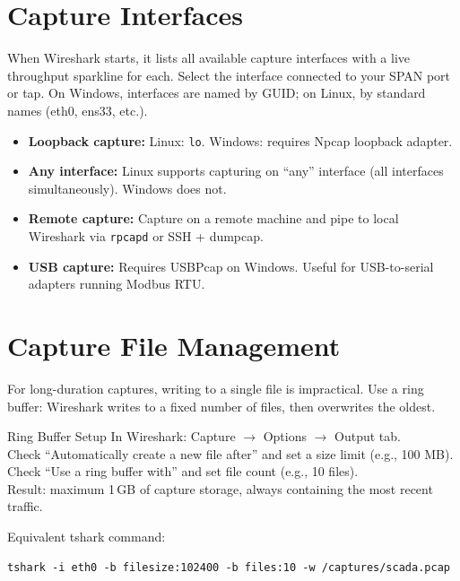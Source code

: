 \documentclass[12pt,twoside,openright]{memoir}
\begin{document}
\section{Capture Interfaces}

When Wireshark starts, it lists all available capture interfaces with a live throughput sparkline for each. Select the interface connected to your SPAN port or tap. On Windows, interfaces are named by GUID; on Linux, by standard names (eth0, ens33, etc.).

\begin{quickref}
\begin{itemize}[noitemsep]
  \item \textbf{Loopback capture:} Linux: \texttt{lo}. Windows: requires Npcap loopback adapter.
  \item \textbf{Any interface:} Linux supports capturing on ``any'' interface (all interfaces simultaneously). Windows does not.
  \item \textbf{Remote capture:} Capture on a remote machine and pipe to local Wireshark via \texttt{rpcapd} or SSH + dumpcap.
  \item \textbf{USB capture:} Requires USBPcap on Windows. Useful for USB-to-serial adapters running Modbus RTU.
\end{itemize}
\end{quickref}

\section{Capture File Management}

For long-duration captures, writing to a single file is impractical. Use a ring buffer: Wireshark writes to a fixed number of files, then overwrites the oldest.

\begin{example}{Ring Buffer Setup}
In Wireshark: Capture $\to$ Options $\to$ Output tab.\\
Check ``Automatically create a new file after'' and set a size limit (e.g., 100 MB).\\
Check ``Use a ring buffer with'' and set file count (e.g., 10 files).\\
Result: maximum 1\,GB of capture storage, always containing the most recent traffic.

Equivalent tshark command:
\begin{lstlisting}
tshark -i eth0 -b filesize:102400 -b files:10 -w /captures/scada.pcap
\end{lstlisting}
\end{example}
\end{document}
